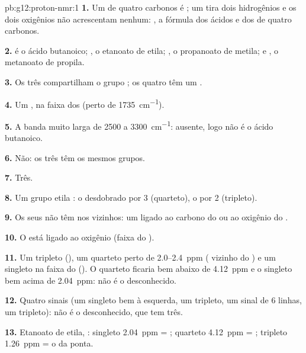 \begin{solution}{pb:g12:proton-nmr:1}
\textbf{1.} Um  de quatro carbonos é ; um  tira
dois hidrogênios e os dois oxigênios não acrescentam nenhum:
, a fórmula dos ácidos e dos  de quatro carbonos.

\textbf{2.}  é o ácido butanoico;
, o etanoato de etila; , o
propanoato de metila; e , o metanoato de
propila.

\textbf{3.} Os três  compartilham o grupo ; os quatro têm um
.

\textbf{4.} Um , na faixa dos  (perto de
\qty{1735}{cm^{-1}}).

\textbf{5.} A banda  muito larga de 2500 a
\qty{3300}{cm^{-1}}: ausente, logo não é o ácido butanoico.

\textbf{6.} Não: os três  têm os mesmos grupos.

\textbf{7.} Três.

\textbf{8.} Um grupo etila : o  desdobrado por 3
 (quarteto), o  por 2 (tripleto).

\textbf{9.} Os seus  não têm  nos  vizinhos: um
 ligado ao carbono do  ou ao oxigênio do .

\textbf{10.} O  está ligado ao oxigênio (faixa do ).

\textbf{11.} Um tripleto (), um quarteto perto de
2.0--\qty{2.4}{ppm} ( vizinho do ) e um singleto na
faixa do  (). O quarteto ficaria bem abaixo de
\qty{4.12}{ppm} e o singleto bem acima de \qty{2.04}{ppm}: não é o
desconhecido.

\textbf{12.} Quatro sinais (um singleto bem à esquerda, um tripleto, um
sinal de 6 linhas, um tripleto): não é o desconhecido, que tem três.

\textbf{13.} Etanoato de etila, : singleto
\qty{2.04}{ppm} = ; quarteto \qty{4.12}{ppm} = ;
tripleto \qty{1.26}{ppm} = o  da ponta.


\end{solution}
